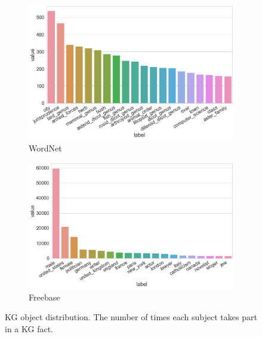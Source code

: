 \begin{figure}[H]
	\begin{subfigure}[b]{.5\linewidth}
   		\centering
    		\includegraphics[width=0.9\linewidth, height=0.6\linewidth]{Wordnet_Object_Counts}
		\captionsetup{justification=centering}
		\caption{WordNet}
	\end{subfigure}
	\begin{subfigure}[b]{.5\linewidth}
   		\centering
		\includegraphics[width=0.9\linewidth, height=0.6\linewidth]{Freebase_Object_Counts}
		\captionsetup{justification=centering}
		\caption{Freebase}
	\end{subfigure}
	\captionsetup{justification=centering}
	\caption{KG object distribution. The number of times each subject takes part in a KG fact.}
\end{figure}

